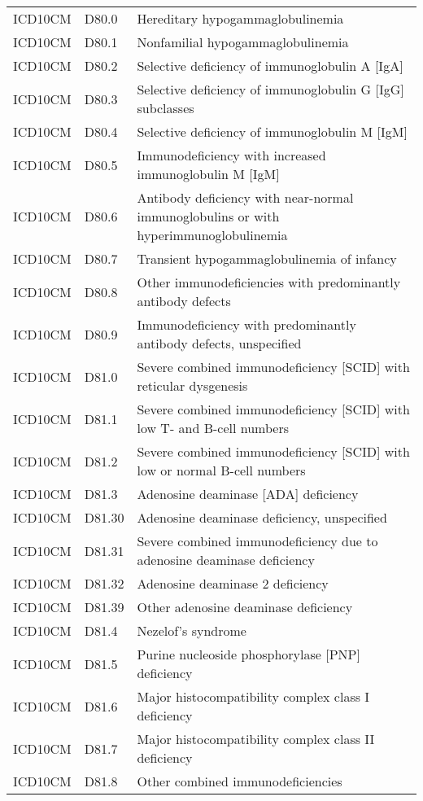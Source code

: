 \begin{table}[ht]
\begin{tabular}{lll}
  ICD10CM & D80.0 & Hereditary hypogammaglobulinemia \\ 
  ICD10CM & D80.1 & Nonfamilial hypogammaglobulinemia \\ 
  ICD10CM & D80.2 & Selective deficiency of immunoglobulin A [IgA] \\ 
  ICD10CM & D80.3 & Selective deficiency of immunoglobulin G [IgG] subclasses \\ 
  ICD10CM & D80.4 & Selective deficiency of immunoglobulin M [IgM] \\ 
  ICD10CM & D80.5 & Immunodeficiency with increased immunoglobulin M [IgM] \\ 
  ICD10CM & D80.6 & Antibody deficiency with near-normal immunoglobulins or with hyperimmunoglobulinemia \\ 
  ICD10CM & D80.7 & Transient hypogammaglobulinemia of infancy \\ 
  ICD10CM & D80.8 & Other immunodeficiencies with predominantly antibody defects \\ 
  ICD10CM & D80.9 & Immunodeficiency with predominantly antibody defects, unspecified \\ 
  ICD10CM & D81.0 & Severe combined immunodeficiency [SCID] with reticular dysgenesis \\ 
  ICD10CM & D81.1 & Severe combined immunodeficiency [SCID] with low T- and B-cell numbers \\ 
  ICD10CM & D81.2 & Severe combined immunodeficiency [SCID] with low or normal B-cell numbers \\ 
  ICD10CM & D81.3 & Adenosine deaminase [ADA] deficiency \\ 
  ICD10CM & D81.30 & Adenosine deaminase deficiency, unspecified \\ 
  ICD10CM & D81.31 & Severe combined immunodeficiency due to adenosine deaminase deficiency \\ 
  ICD10CM & D81.32 & Adenosine deaminase 2 deficiency \\ 
  ICD10CM & D81.39 & Other adenosine deaminase deficiency \\ 
  ICD10CM & D81.4 & Nezelof's syndrome \\ 
  ICD10CM & D81.5 & Purine nucleoside phosphorylase [PNP] deficiency \\ 
  ICD10CM & D81.6 & Major histocompatibility complex class I deficiency \\ 
  ICD10CM & D81.7 & Major histocompatibility complex class II deficiency \\ 
  ICD10CM & D81.8 & Other combined immunodeficiencies \\ 

\end{tabular}
\end{table}
